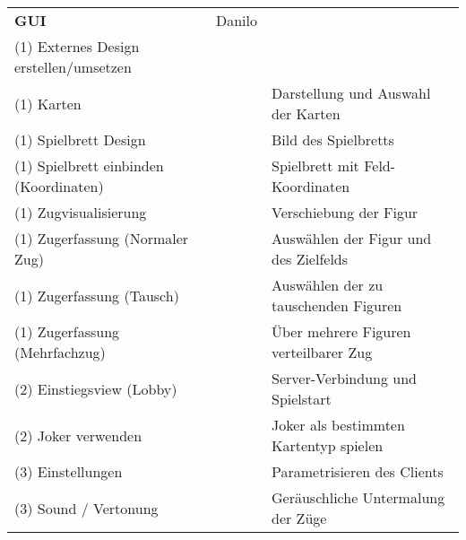 \documentclass[a4paper,12pt,halfparskip,DIV14]{scrreprt}
\begin{document}
\begin{tabular}{@{} l l l @{}}
\midrule
\textbf{GUI} & Danilo & \\
(1) Externes Design erstellen/umsetzen &  & \\
(1) Karten &  & Darstellung und Auswahl der Karten \\
(1) Spielbrett Design &  & Bild des Spielbretts \\
(1) Spielbrett einbinden (Koordinaten) &  & Spielbrett mit Feld-Koordinaten \\
(1) Zugvisualisierung &  & Verschiebung der Figur \\
(1) Zugerfassung (Normaler Zug) &  & Auswählen der Figur und des Zielfelds \\
(1) Zugerfassung (Tausch) &  & Auswählen der zu tauschenden Figuren \\
(1) Zugerfassung (Mehrfachzug) &  & Über mehrere Figuren verteilbarer Zug \\
(2) Einstiegsview (Lobby) &  & Server-Verbindung und Spielstart \\
(2) Joker verwenden &  & Joker als bestimmten Kartentyp spielen \\
(3) Einstellungen &  & Parametrisieren des Clients \\
(3) Sound / Vertonung &  & Geräuschliche Untermalung der Züge \\
\bottomrule
\end{tabular}
\end{document}
